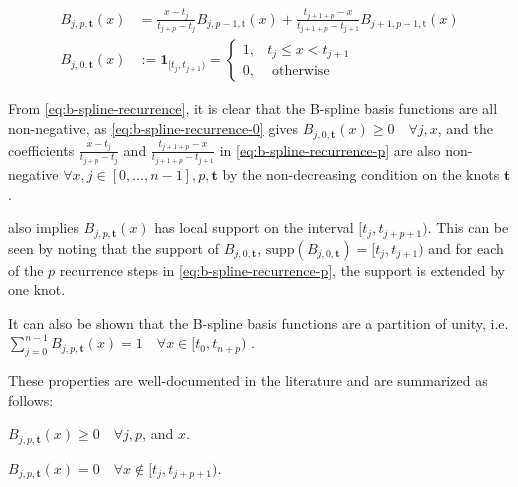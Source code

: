 \begin{subequations}\label{eq:b-spline-recurrence}
    \begin{align}
        B_{j, p, \mathbf{t}}(x) & =\frac{x-t_j}{t_{j+p}-t_j} B_{j, p-1, \mathrm{t}}(x)+\frac{t_{j+1+p}-x}{t_{j+1+p}-t_{j+1}} B_{j+1, p-1, \mathrm{t}}(x) \label{eq:b-spline-recurrence-p} \\
        B_{j, 0, \mathbf{t}}(x) & := 
        \mathbf 1_{[t_j, t_{j+1})} =
        \begin{cases}
            1, & t_j \leq x<t_{j+1} \\
            0, & \text { otherwise }
        \end{cases} \label{eq:b-spline-recurrence-0}
    \end{align}
\end{subequations}

From \cref{eq:b-spline-recurrence}, it is clear that the B-spline basis functions are all non-negative, as \cref{eq:b-spline-recurrence-0} gives $B_{j, 0, \mathbf{t}}(x) \geq 0 \quad\forall j, x$, and the coefficients $\frac{x-t_j}{t_{j+p}-t_j}$ and $\frac{t_{j+1+p}-x}{t_{j+1+p}-t_{j+1}}$
in \cref{eq:b-spline-recurrence-p} are also non-negative $\forall x, j\in[0,\dots,n-1], p, \mathbf t$ by the non-decreasing condition on the knots $\mathbf t$. 

 also implies $B_{j, p, \mathbf{t}}(x)$ has local support on the interval $[t_j, t_{j+p+1})$. This can be seen by noting that the support of $B_{j, 0, \mathbf{t}}$, $\text{supp}(B_{j, 0, \mathbf{t}}) = [t_j, t_{j+1})$ and for each of the $p$ recurrence steps in \cref{eq:b-spline-recurrence-p}, the support is extended by one knot. 

It can also be shown that the B-spline basis functions are a partition of unity, i.e. $\sum_{j=0}^{n-1} B_{j, p, \mathbf{t}}(x) = 1 \quad\forall x \in [t_0, t_{n+p})$ \citep{deBoor1978practicalguide}.

These properties are well-documented in the literature and are summarized as follows:
\begin{property}[Nonnegativity]\label{b-prop:nonnegativity}
    $B_{j, p, \mathbf{t}}(x) \geq 0 \quad\forall j, p$, and $x$.
\end{property}

\begin{property}\label{b-prop:localsupport}
    $B_{j, p, \mathbf{t}}(x)=0 \quad\forall x \notin [t_j, t_{j+p+1})$.
\end{property}

